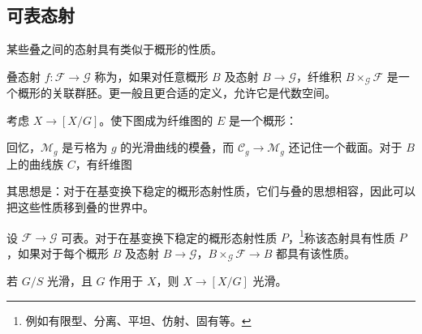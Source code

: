 \subsection{可表态射}
某些叠之间的态射具有类似于概形的性质。
\begin{definition}\label{def:2.7}
叠态射 $f:\mathcal F\to\mathcal G$ 称为，如果对任意概形 $B$ 及态射 $B\to\mathcal G$，纤维积 $B\times_{\mathcal G}\mathcal F$ 是一个概形的关联群胚。更一般且更合适的定义，允许它是代数空间。
\end{definition}
\begin{example}\label{ex:2.19}
考虑 $X\to[X/G]$。使下图成为纤维图的 $E$ 是一个概形：
\end{example}
\begin{example}\label{ex:2.20}
回忆，$\mathcal M_g$ 是亏格为 $g$ 的光滑曲线的模叠，而 $\mathcal C_g\to\mathcal M_g$ 还记住一个截面。对于 $B$ 上的曲线族 $C$，有纤维图
\end{example}
其思想是：对于在基变换下稳定的概形态射性质，它们与叠的思想相容，因此可以把这些性质移到叠的世界中。
\begin{definition}\label{def:2.8}
设 $\mathcal F\to\mathcal G$ 可表。对于在基变换下稳定的概形态射性质 $P$，\footnote{例如有限型、分离、平坦、仿射、固有等。}称该态射具有性质 $P$，如果对于每个概形 $B$ 及态射 $B\to\mathcal G$，$B\times_{\mathcal G}\mathcal F\to B$ 都具有该性质。
\end{definition}
\begin{example}\label{ex:2.21}
若 $G/S$ 光滑，且 $G$ 作用于 $X$，则 $X\to[X/G]$ 光滑。
\end{example}
